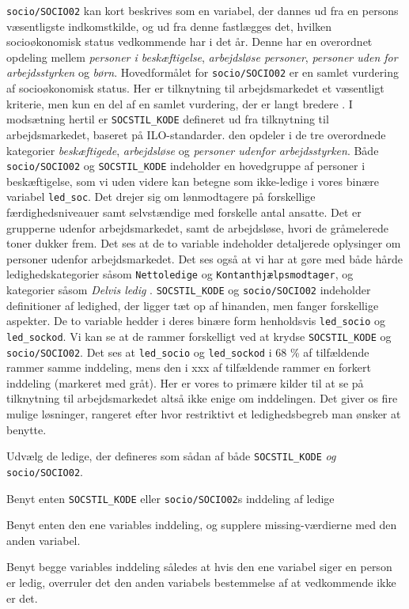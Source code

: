 \texttt{socio/SOCIO02} kan kort beskrives som en variabel, der dannes ud fra en persons væsentligste indkomstkilde, og ud fra denne fastlægges det, hvilken socioøkonomisk status vedkommende har i det år. Denne har en overordnet opdeling mellem \emph{personer i beskæftigelse}, \emph{arbejdsløse personer},
\emph{personer uden for arbejdsstyrken} og \emph{børn}. Hovedformålet for \texttt{socio/SOCIO02} er en samlet vurdering af socioøkonomisk status. Her er tilknytning til arbejdsmarkedet et væsentligt kriterie, men kun en del af en samlet vurdering, der er langt bredere \parencite[8]{Plovsing1997}. 
I modsætning hertil er \texttt{SOCSTIL\_KODE} defineret ud fra tilknytning til arbejdsmarkedet, baseret på ILO-standarder. den opdeler i de tre overordnede kategorier \emph{beskæftigede}, \emph{arbejdsløse} og \emph{personer udenfor arbejdsstyrken}. 
Både \texttt{socio/SOCIO02} og \texttt{SOCSTIL\_KODE} indeholder en hovedgruppe af personer i beskæftigelse, som vi uden videre kan betegne som ikke-ledige i vores binære variabel \texttt{led\_soc}.  Det drejer sig om lønmodtagere på forskellige færdighedsniveauer samt selvstændige med forskelle antal ansatte. Det er grupperne udenfor arbejdsmarkedet, samt de arbejdsløse, hvori de gråmelerede toner dukker frem. 
Det ses at de to variable indeholder detaljerede oplysinger om personer udenfor arbejdsmarkedet. Det ses også at vi har at gøre med både hårde ledighedskategorier såsom \texttt{Nettoledige} og \texttt{Kontanthjælpsmodtager}, og kategorier såsom \emph{Delvis ledig} %
. \texttt{SOCSTIL\_KODE} og \texttt{socio/SOCIO02} indeholder definitioner af ledighed, der ligger tæt op af hinanden, men fanger forskellige aspekter. De to variable hedder i deres binære form henholdsvis \texttt{led\_socio} og \texttt{led\_sockod}. Vi kan se at de rammer forskelligt ved at krydse \texttt{SOCSTIL\_KODE} og \texttt{socio/SOCIO02}.
Det ses at \texttt{led\_socio} og \texttt{led\_sockod} i 68 \% af tilfældende %
rammer samme inddeling, mens den  i xxx af tilfældende rammer en forkert inddeling (markeret med gråt). Her er vores to primære kilder til at se på tilknytning til arbejdsmarkedet altså ikke enige om inddelingen. Det giver os fire mulige løsninger, rangeret efter hvor restriktivt et ledighedsbegreb man ønsker at benytte.
%
\begin{description} [topsep=6pt,itemsep=-1ex]
  \item[Restriktiv] Udvælg de ledige, der defineres som sådan af både \texttt{SOCSTIL\_KODE} \emph{og} \texttt{socio/SOCIO02}.
  \item[Semi-restriktiv] Benyt enten \texttt{SOCSTIL\_KODE} eller \texttt{socio/SOCIO02}s inddeling af ledige
  \item[Semi-bred] Benyt enten den ene variables inddeling, og supplere missing-værdierne med den anden variabel.
 \item[Bred] Benyt begge variables inddeling således at hvis den ene variabel siger en person er ledig, overruler det den anden variabels bestemmelse af at vedkommende ikke er det.
\end{description}
